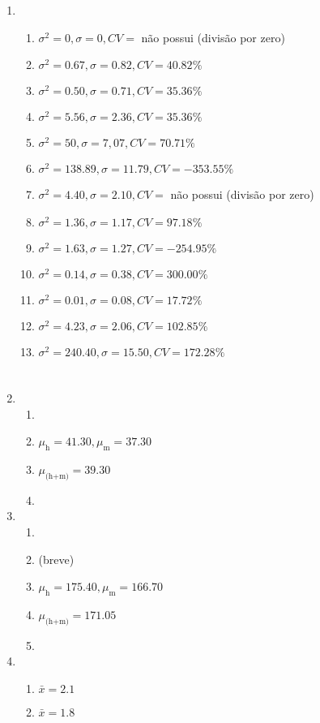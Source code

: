 \documentclass[a4paper]{article}
\begin{document}
\begin{enumerate}
\item %
  \begin{enumerate}
  \item $\sigma^2=0, \sigma=0,CV=$ não possui (divisão por zero)
  \item $\sigma^2=0.67, \sigma=0.82,CV=40.82\%$
  \item $\sigma^2=0.50, \sigma=0.71,CV=35.36\%$
  \item $\sigma^2=5.56, \sigma=2.36,CV=35.36\%$
  \item $\sigma^2=50, \sigma=7,07,CV=70.71\%$
  \item $\sigma^2=138.89, \sigma=11.79,CV=-353.55\%$
  \item $\sigma^2=4.40, \sigma=2.10,CV=$ não possui (divisão por zero)
  \item $\sigma^2=1.36, \sigma=1.17,CV=97.18\%$
  \item $\sigma^2=1.63, \sigma=1.27,CV=-254.95\%$
  \item $\sigma^2=0.14, \sigma=0.38,CV=300.00\%$
  \item $\sigma^2=0.01, \sigma=0.08,CV=17.72\%$
  \item $\sigma^2=4.23, \sigma=2.06,CV=102.85\%$
  \item $\sigma^2=240.40, \sigma=15.50,CV=172.28\%$
  \end{enumerate}

 \section{}

 \item 
   \begin{enumerate}
   \item
   \item $\mu_\text{h} = 41.30, \mu_\text{m} = 37.30$
   \item $\mu_\text{(h+m)} = 39.30$
   \item 
   \end{enumerate}

 \item 
   \begin{enumerate}
   \item
   \item (breve)
   \item $\mu_\text{h} = 175.40, \mu_\text{m} = 166.70$
   \item $\mu_\text{(h+m)} = 171.05$
   \item 
   \end{enumerate}

 \item 
   \begin{enumerate}
   \item $\bar x = 2.1$
   \item $\bar x = 1.8$
   \end{enumerate}

\end{enumerate}
\end{document}
